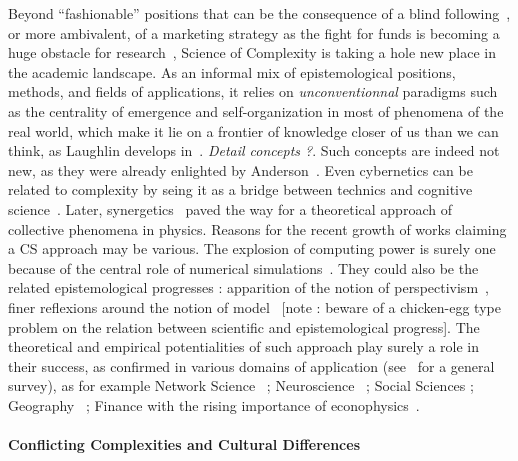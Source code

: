 Beyond ``fashionable'' positions that can be the consequence of a blind following~\cite{dirk1999measure}, or more ambivalent, of a marketing strategy as the fight for funds is becoming a huge obstacle for research~\cite{bollen2014funding}, Science of Complexity is taking a hole new place in the academic landscape.
As an informal mix of epistemological positions, methods, and fields of applications, it relies on \emph{unconventionnal} paradigms such as the centrality of emergence and self-organization in most of phenomena of the real world, which make it lie on a frontier of knowledge closer of us than we can think, as Laughlin develops in~\cite{laughlin2006different}. \textit{Detail concepts ?}. Such concepts are indeed not new, as they were already enlighted by Anderson~\cite{anderson1972more}. Even cybernetics can be related to complexity by seing it as a bridge between technics and cognitive science~\cite{wiener1948cybernetics}. Later, synergetics~\cite{haken1980synergetics} paved the way for a theoretical approach of collective phenomena in physics. Reasons for the recent growth of works claiming a CS approach may be various. The explosion of computing power is surely one because of the central role of numerical simulations~\cite{varenne2010simulations}. They could also be the related epistemological progresses : apparition of the notion of perspectivism~\cite{giere2010scientific}, finer reflexions around the notion of model~\cite{varenne2013modeliser} [note : beware of a chicken-egg type problem on the relation between scientific and epistemological progress]. The theoretical and empirical potentialities of such approach play surely a role in their success, as confirmed in various domains of application (see~\cite{newman2011complex} for a general survey), as for example Network Science~\cite{barabasi2002linked} ; Neuroscience~\cite{koch1999complexity} ; Social Sciences  ; Geography~\cite{manson2001simplifying}\cite{pumain1997pour} ; Finance with the rising importance of econophysics~\cite{stanley1999econophysics}.




\paragraph{Conflicting Complexities and Cultural Differences}

